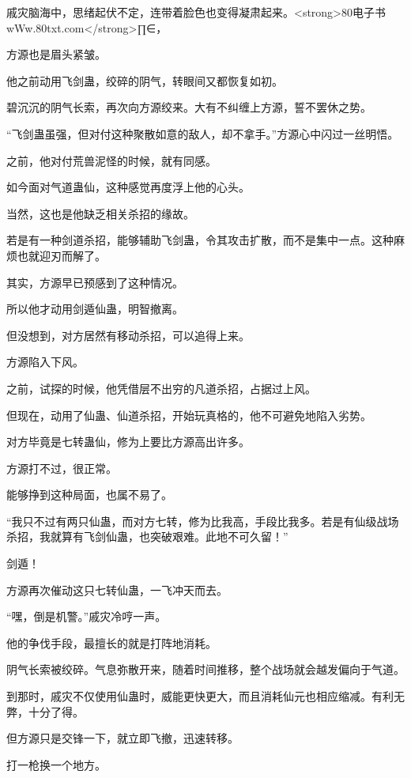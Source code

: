 
\begin{this_body}

戚灾脑海中，思绪起伏不定，连带着脸色也变得凝肃起来。<strong>80电子书wWw.80txt.com</strong>∏∈，

方源也是眉头紧皱。

他之前动用飞剑蛊，绞碎的阴气，转眼间又都恢复如初。

碧沉沉的阴气长索，再次向方源绞来。大有不纠缠上方源，誓不罢休之势。

“飞剑蛊虽强，但对付这种聚散如意的敌人，却不拿手。”方源心中闪过一丝明悟。

之前，他对付荒兽泥怪的时候，就有同感。

如今面对气道蛊仙，这种感觉再度浮上他的心头。

当然，这也是他缺乏相关杀招的缘故。

若是有一种剑道杀招，能够辅助飞剑蛊，令其攻击扩散，而不是集中一点。这种麻烦也就迎刃而解了。

其实，方源早已预感到了这种情况。

所以他才动用剑遁仙蛊，明智撤离。

但没想到，对方居然有移动杀招，可以追得上来。

方源陷入下风。

之前，试探的时候，他凭借层不出穷的凡道杀招，占据过上风。

但现在，动用了仙蛊、仙道杀招，开始玩真格的，他不可避免地陷入劣势。

对方毕竟是七转蛊仙，修为上要比方源高出许多。

方源打不过，很正常。

能够挣到这种局面，也属不易了。

“我只不过有两只仙蛊，而对方七转，修为比我高，手段比我多。若是有仙级战场杀招，我就算有飞剑仙蛊，也突破艰难。此地不可久留！”

剑遁！

方源再次催动这只七转仙蛊，一飞冲天而去。

“嘿，倒是机警。”戚灾冷哼一声。

他的争伐手段，最擅长的就是打阵地消耗。

阴气长索被绞碎。气息弥散开来，随着时间推移，整个战场就会越发偏向于气道。

到那时，戚灾不仅使用仙蛊时，威能更快更大，而且消耗仙元也相应缩减。有利无弊，十分了得。

但方源只是交锋一下，就立即飞撤，迅速转移。

打一枪换一个地方。


\end{this_body}
